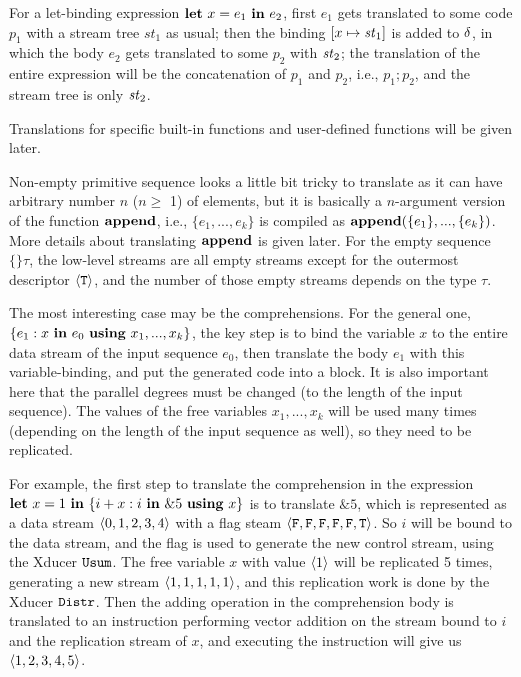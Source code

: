 For a let-binding expression $\mathbf{let} \ x = e_1 \ \mathbf{in} \ e_2$,  first $e_1$ gets translated to some code $p_1$ with a stream tree $st_1$ as usual; then the binding $[x \|-> \st_1]$ is added to $\delta$, in which the body $e_2$ gets translated to some $p_2$ with $\mathit{st}_2$; the translation of the entire expression will be the concatenation of $p_1$ and $p_2$, i.e., $p_1;p_2$, and the stream tree is only $\mathit{st}_2$.

Translations for specific built-in functions and user-defined functions will be given later.


Non-empty primitive sequence looks a little bit tricky to translate as it can have arbitrary  number $n$ ($ n \ge$ 1) of elements, but it is basically a $n$-argument version of the function $\mathbf{append}$,
i.e.,  $\{e_1,...,e_k\}$ is compiled as $\mathbf{append}(\{e_1\},...,\{e_k\})$. 
More details about translating $\mathbf{append}$ is given later. 
For the empty sequence $\{\}\tau$, the low-level streams are all empty streams except for the outermost descriptor $\langle \mathtt{T} \rangle$, and the number of those empty streams depends on the type $\tau$.

The most interesting case may be the comprehensions. 
For the general one, $\{e_1 : x \ \mathbf{in} \ e_0 \ \mathbf{using} \ x_1,...,x_k\}$, the key step is to bind the variable $x$ to the entire data stream of the input sequence $e_0$, then translate the body $e_1$ with this variable-binding, and put the generated code into a \wc block. 
It is also important here that the parallel degrees must be changed (to the length of the input sequence).
The values of the free variables  $x_1,...,x_k$ will be used many times (depending on the length of the input sequence as well), so they need to be replicated.

For example, the first step to translate the comprehension in the expression $\mathbf{let} \ x = 1 \ \mathbf{in} \ \{i+x : i \ \mathbf{in} \ \&5 \ \mathbf{using} \ x\}$ is to translate $\&5$, which is represented as a data stream $\<0,1,2,3,4\'>$ with a flag steam $\<\F,\F,\F,\F,\F,\T\'>$.
So $i$ will be bound to the data stream, and the flag is used to generate the new control stream, using the Xducer $\mathtt{Usum}$.
The free variable $x$ with value $\langle 1 \rangle$ will be replicated 5 times, generating a new stream $\<1,1,1,1,1\'>$, and this replication work is done by the Xducer $\mathtt{Distr}$.
Then the adding operation in the comprehension body is translated to an instruction performing vector addition on the stream bound to $i$ and the replication stream of $x$, and executing the instruction will give us $\<1,2,3,4,5\'>$. 


